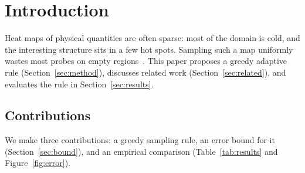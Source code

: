 \section{Introduction}\label{sec:intro}
Heat maps of physical quantities are often sparse: most of the domain is cold,
and the interesting structure sits in a few hot spots. Sampling such a map
uniformly wastes most probes on empty regions~\cite{candes2006}. This paper
proposes a greedy adaptive rule (Section~\ref{sec:method}), discusses related
work (Section~\ref{sec:related}), and evaluates the rule in
Section~\ref{sec:results}.

\subsection{Contributions}
We make three contributions: a greedy sampling rule, an error bound for it
(Section~\ref{sec:bound}), and an empirical comparison
(Table~\ref{tab:results} and Figure~\ref{fig:error}).
